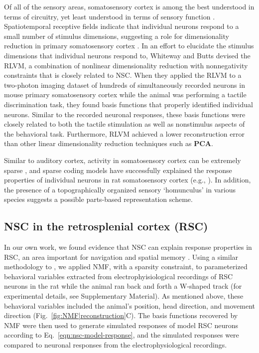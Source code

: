 Of all of the sensory areas,
somatosensory cortex is among the best understood in terms of circuitry,
yet least understood in terms of sensory function
\cite{Ramirez2014}.
Spatiotemporal receptive fields indicate that individual neurons respond to a small number of stimulus dimensions, suggesting a role for dimensionality reduction in primary somatosensory cortex \cite{Ramirez2014}.
In an effort to elucidate the stimulus dimensions that individual neurons respond to,
Whiteway and Butts \cite{WhitewayButts2017} devised the \ac{RLVM},
a combination of nonlinear dimensionality reduction with nonnegativity constraints
that is closely related to \ac{NSC}.
When they applied the \ac{RLVM} to 
a two-photon imaging dataset of hundreds of simultaneously recorded neurons 
in mouse primary somatosensory cortex while the animal was performing
a tactile discrimination task,
they found basis functions that properly identified individual neurons.
Similar to the recorded neuronal responses, these basis functions were closely related
to both the tactile stimulation as well as 
nonstimulus aspects of the behavioral task.
Furthermore, \ac{RLVM} achieved a lower reconstruction error than other
linear dimensionality reduction techniques such as \textbf{\ac{PCA}}.

Similar to auditory cortex,
activity in somatosensory cortex can be extremely sparse
\cite{Jadhav2009,oconnor2010,Crochet2011},
and sparse coding models have successfully explained the response properties
of individual neurons in rat somatosensory cortex (e.g., \cite{Hafner2004}).
In addition, the presence of a topographically organized sensory `homunculus' 
in various species \cite{penfield1937,hari1993,petersen2007} 
suggests a possible parts-based representation scheme.


\subsection*{NSC in the retrosplenial cortex (RSC)}

In our own work, we found evidence that \ac{NSC} 
can explain response properties in \ac{RSC}, 
an area important for navigation and spatial memory 
\cite{Miller2014,Nelson2015,VannAggleton2009}.
Using a similar methodology to \cite{Beyeler2016},
we applied \ac{NMF}, with a sparsity constraint,
to parameterized behavioral variables extracted from electrophyisiological recordings
of \ac{RSC} neurons in the rat \cite{AlexanderNitz2015}
while the animal ran back and forth a W-shaped track
(for experimental details, see Supplementary Material).
As mentioned above, these behavioral variables included the animal's position, head direction, 
and movement direction (Fig.~\ref{fig:NMF|reconstruction}C).
The basis functions recovered by \ac{NMF} were then used to generate simulated responses
of model \ac{RSC} neurons according to Eq.~\ref{eqn:nsc-model-response},
and the simulated responses were compared to neuronal responses 
from the electrophysiological recordings.

